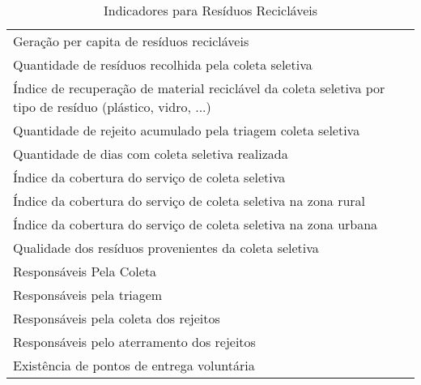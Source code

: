 \begin{table}[h!]
  \centering
  \caption{Indicadores para Resíduos Recicláveis}
    \begin{tabular}{|p{25em}|}
    \rowcolor[rgb]{ .984,  .831,  .706} \multicolumn{1}{P{25em}}{RESÍDUOS SÓLIDOS URBANOS RECICLÁVEIS (COLETA SELETIVA)} \\
    \midrule
    Geração per capita de resíduos recicláveis \\
    \midrule
    Quantidade de resíduos recolhida pela coleta seletiva \\
    \midrule
    Índice de recuperação de material reciclável da coleta seletiva por tipo de resíduo (plástico, vidro, ...) \\
    \midrule
    Quantidade de rejeito acumulado pela triagem coleta seletiva \\
    \midrule
    Quantidade de dias com coleta seletiva realizada \\
    \midrule
    Índice da cobertura do serviço de coleta seletiva \\
    \midrule
    Índice da cobertura do serviço de coleta seletiva na zona rural \\
    \midrule
    Índice da cobertura do serviço de coleta seletiva na zona urbana \\
    \midrule
    Qualidade dos resíduos provenientes da coleta seletiva \\
    \midrule
    Responsáveis Pela Coleta \\
    \midrule
    Responsáveis pela triagem \\
    \midrule
    Responsáveis pela coleta dos rejeitos  \\
    \midrule
    Responsáveis pelo aterramento dos rejeitos \\
    \midrule
    Existência de pontos de entrega voluntária \\
    \bottomrule
    \end{tabular}%
  \label{tab:ind_reciclaveis}%
\end{table}%
